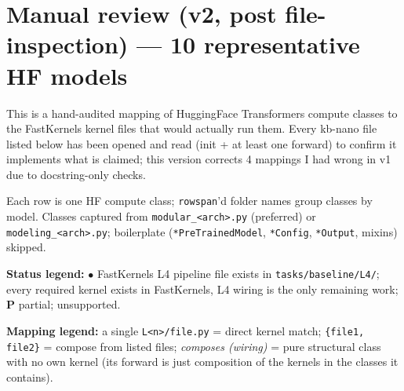 \documentclass[10pt]{article}
\newcommand{\cmark}{\ding{51}}
\newcommand{\xmark}{\ding{55}}
\newcommand{\fastkernels}{FastKernels}
\begin{document}
\section*{Manual review (v2, post file-inspection) --- 10 representative HF models}

\noindent
This is a hand-audited mapping of HuggingFace Transformers compute classes to
the \fastkernels{} kernel files that would actually run them. Every kb-nano
file listed below has been opened and read (init + at least one forward) to
confirm it implements what is claimed; this version corrects 4 mappings I had
wrong in v1 due to docstring-only checks.

Each row is one HF compute class; \texttt{rowspan}'d folder names group
classes by model. Classes captured from \texttt{modular\_<arch>.py}
(preferred) or \texttt{modeling\_<arch>.py}; boilerplate
(\texttt{*PreTrainedModel}, \texttt{*Config}, \texttt{*Output}, mixins) skipped.

\textbf{Status legend:} $\bullet$ \fastkernels{} L4 pipeline file exists
in \texttt{tasks/baseline/L4/}; \cmark{} every required kernel exists in
\fastkernels{}, L4 wiring is the only remaining work; \textbf{P} partial;
\xmark{} unsupported.

\textbf{Mapping legend:} a single \texttt{L<n>/file.py} = direct kernel match;
\texttt{\{file1, file2\}} = compose from listed files;
\textit{composes (wiring)} = pure structural class with no own kernel
(its forward is just composition of the kernels in the classes it contains).
\end{document}
